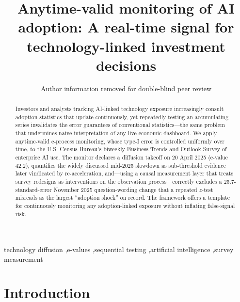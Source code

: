\documentclass[preprint,12pt]{elsarticle}
\begin{document}
\begin{frontmatter}

\title{Anytime-valid monitoring of AI adoption: A real-time signal for technology-linked investment decisions}

\author{Author information removed for double-blind peer review}

\begin{abstract}
Investors and analysts tracking AI-linked technology exposure increasingly consult adoption statistics that update continuously, yet repeatedly testing an accumulating series invalidates the error guarantees of conventional statistics---the same problem that undermines naive interpretation of any live economic dashboard. We apply anytime-valid e-process monitoring, whose type-I error is controlled uniformly over time, to the U.S. Census Bureau's biweekly Business Trends and Outlook Survey of enterprise AI use. The monitor declares a diffusion takeoff on 20 April 2025 (e-value 42.2), quantifies the widely discussed mid-2025 slowdown as sub-threshold evidence later vindicated by re-acceleration, and---using a causal measurement layer that treats survey redesigns as interventions on the observation process---correctly excludes a 25.7-standard-error November 2025 question-wording change that a repeated $z$-test misreads as the largest ``adoption shock'' on record. The framework offers a template for continuously monitoring any adoption-linked exposure without inflating false-signal risk.
\end{abstract}

\begin{keyword}
technology diffusion \sep e-values \sep sequential testing \sep artificial intelligence \sep survey measurement
\end{keyword}

\end{frontmatter}

\section{Introduction}
\end{document}
